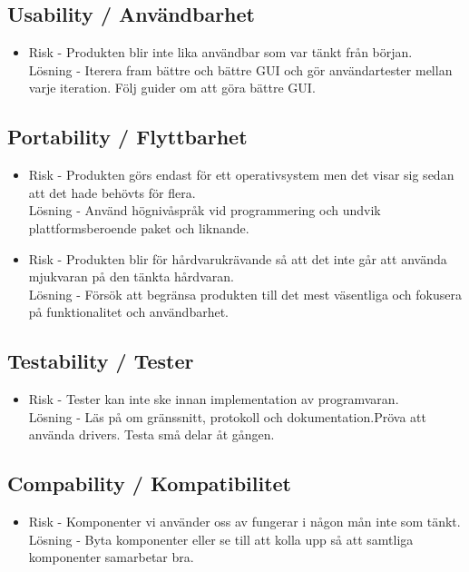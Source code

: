 \subsection{Usability / Användbarhet}
\begin{itemize}
\item Risk - Produkten blir inte lika användbar som var tänkt från början.
\\Lösning - Iterera fram bättre och bättre GUI och gör användartester mellan varje iteration. Följ guider om att göra bättre GUI.
\end{itemize}

\subsection{Portability / Flyttbarhet}
\begin{itemize}
\item Risk - Produkten görs endast för ett operativsystem men det visar sig sedan att det hade behövts för flera.
\\Lösning - Använd högnivåspråk vid programmering och undvik plattformsberoende paket och liknande.
\item Risk - Produkten blir för hårdvarukrävande så att det inte går att använda mjukvaran på den tänkta hårdvaran.
\\Lösning - Försök att begränsa produkten till det mest väsentliga och fokusera på funktionalitet och användbarhet.
\end{itemize}

\subsection{Testability / Tester}
\begin{itemize}
\item Risk - Tester kan inte ske innan implementation av programvaran.
\\Lösning - Läs på om gränssnitt, protokoll och dokumentation.Pröva att använda drivers. Testa små delar åt gången.
\end{itemize}

\subsection{Compability / Kompatibilitet}
\begin{itemize}
\item Risk - Komponenter vi använder oss av fungerar i någon mån inte som tänkt.
\\Lösning - Byta komponenter eller se till att kolla upp så att samtliga komponenter samarbetar bra.
\end{itemize}

